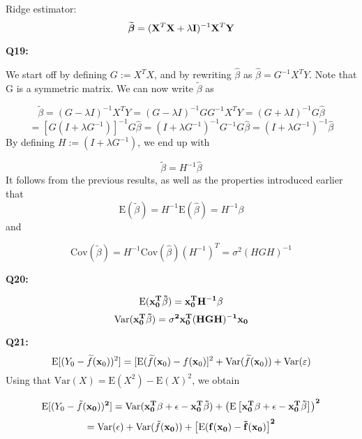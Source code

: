 \documentclass[]{article}
\newenvironment{Shaded}{\begin{snugshade}}{\end{snugshade}}
\newcommand{\KeywordTok}[1]{\textcolor[rgb]{0.13,0.29,0.53}{\textbf{#1}}}
\newcommand{\StringTok}[1]{\textcolor[rgb]{0.31,0.60,0.02}{#1}}
\newcommand{\OperatorTok}[1]{\textcolor[rgb]{0.81,0.36,0.00}{\textbf{#1}}}
\newcommand{\NormalTok}[1]{#1}
\begin{document}
Ridge estimator: \[
\widetilde{\boldsymbol \beta}=({\bf X}^T{\bf X}+\lambda {\bf I})^{-1}{\bf X}^T{\bf Y}
\]

\textbf{Q19:}

We start off by defining \(G := X^TX\), and by rewriting \(\hat{\beta}\)
as \(\hat{\beta} = G^{-1}X^TY\). Note that G is a symmetric matrix. We
can now write \(\tilde{\beta}\) as

\[
\tilde{\beta} = (G - {\lambda}I)^{-1}X^TY = (G - {\lambda}I)^{-1}GG^{-1}X^TY = (G + {\lambda}I)^{-1}G\hat{\beta}
\] \[
= \left[G(I + {\lambda}G^{-1})\right]^{-1}G\hat{\beta} = (I + {\lambda}G^{-1})^{-1}G^{-1}G\hat{\beta} = (I + {\lambda}G^{-1})^{-1}\hat{\beta}
\] By defining \(H := (I + {\lambda}G^{-1})\), we end up with

\[
\tilde{\beta} = H^{-1}\hat{\beta}
\] It follows from the previous results, as well as the properties
introduced earlier that \[
\text{E}(\tilde{\beta}) = H^{-1}\text{E}(\hat{\beta}) = H^{-1}\beta
\] and

\[
\text{Cov}(\tilde{\beta}) = H^{-1}\text{Cov}(\hat{\beta})(H^{-1})^T = \sigma^2(HGH)^{-1}
\]

\textbf{Q20:}

\[
\text{E}(\bf{x}_0^T\tilde{\beta}) = \bf{x}_0^TH^{-1}\beta
\] \[
\text{Var}(\bf{x}_0^T\tilde{\beta}) = \sigma^2\bf{x}_0^T(HGH)^{-1}\bf{x}_0
\]

\textbf{Q21:}
\[\text{E}[(Y_0-\widetilde{f}({\bf x}_0))^2]=[\text{E}(\widetilde{f}({\bf x}_0)-f({\bf x}_0)]^2+\text{Var}(\widetilde{f}({\bf x}_0) ) + \text{Var}(\varepsilon)\]
Using that \(\text{Var}(X) = \text{E}(X^2) - \text{E}(X)^2\), we obtain

\[
\text{E}[(Y_0-\tilde{f}(\bf{x}_0))^2] = \text{Var}(\bf{x}_0^T\beta + \epsilon - \bf{x}_0^T\tilde{\beta}) + \left(\text{E}\left[\bf{x}_0^T\beta + \epsilon - \bf{x}_0^T\tilde{\beta}\right]\right)^2
\] \[
=\text{Var}(\epsilon) + \text{Var}(\tilde{f}(\bf{x_0})) + \left[\text{E}(f(\bf{x_0}) - \tilde{f}(\bf{x}_0) \right]^2
\]

\begin{Shaded}
\end{Shaded}
\end{document}
